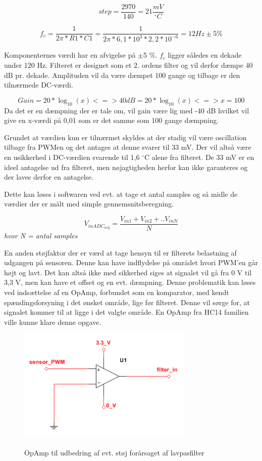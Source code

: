 \begin{equation}
step = \frac{2970}{140} = 21 \frac{mV}{^{\circ}C}
\end{equation}


\begin{equation}
f_c = \frac{1}{2 \pi * R1 * C1} = \frac{1}{2 \pi * 6,1*10^3  * 2,2*10^{-6}} = 12 Hz\pm5 \%
\end{equation}

Komponenternes værdi har en afvigelse på $\pm$5 \%.
$f_c$ ligger således en dekade under 120 Hz. Filteret er designet som et 2. ordens filter og vil derfor dæmpe 40 dB pr. dekade. Amplituden vil da være dæmpet 100 gange og tilbage er den tilnærmede DC-værdi. 

\begin{equation}
Gain = 20 * \log_{10}(x) <=> 40 dB = 20 * \log_ {10}(x) <=> x = 100
\end{equation} 
Da det er en dæmpning der er tale om, vil gain være lig med -40 dB hvilket vil give en x-værdi på 0,01 som er det samme som 100 gange dæmpning.

Grundet at værdien kun er tilnærmet skyldes at der stadig vil være oscillation tilbage fra PWMen og det antages at denne svarer til 33 mV. Der vil altså være en usikkerhed i DC-værdien svarende til 1,6 $^{\circ}$C alene fra filteret. De 33 mV er en ideel antagelse ud fra filteret, men nøjagtigheden herfor kan ikke garanteres og der laves derfor en antagelse.

Dette kan løses i softwaren ved evt. at tage et antal samples og så midle de værdier der er målt med simple gennemsnitsberegning. 

\begin{equation}
V_{inADC_{avg}} = \frac{V_{in1} + V_{in2} + .. V_{inN}}{N}
\end{equation} 
\textit{hvor N = antal samples}

En anden støjfaktor der er værd at tage hensyn til er filterets belastning af udgangen på sensoren. Denne kan have indflydelse på området hvori PWM'en går højt og lavt. Det kan altså ikke med sikkerhed siges at signalet vil gå fra 0 V til 3,3 V, men kan have et offset og en evt. dæmpning. Denne problematik kan løses ved indsættelse af en OpAmp, forbundet som en komparator, med kendt spændingsforsyning i det ønsket område, lige før filteret. Denne vil sørge for, at signalet kommer til at ligge i det valgte område. En OpAmp fra HC14 familien ville kunne klare denne opgave. 

\begin{figure}[htb]
\centering
{\includegraphics[width=0.75\textwidth]{filer/design/Billeder/sht_opamp}}
\caption{OpAmp til udbedring af evt. støj forårsaget af lavpasfilter}
\label{lab:sht_opamp}
\end{figure}
